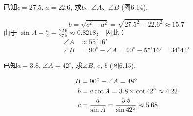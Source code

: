 \begin{example}
    已知$c=27.5$, $a=22.6$, 求$b$、$\angle A$、$\angle B$ (图6.14).
\end{example}

\begin{solution}
\[b=\sqrt{c^2-a^2}=\sqrt{27.5^2-22.6^2}\approx 15.7\]
由于
$\sin A=\frac{a}{c}=\frac{22.6}{27.5}\approx 0.8218$，
因此：
\[\begin{split}
    \angle A&\approx 55^{\circ}16'\\
\angle B&=90^{\circ}-\angle A=90^{\circ}-55^{\circ}16'=34^{\circ}44'
\end{split}\]
\end{solution}


\begin{example}
    已知$a=3.8$, $\angle A=42^{\circ}$, 求$\angle B$, $c$, $b$ (图6.15).
\end{example}

\begin{solution}
\[\begin{split}
    B&=90^{\circ} -\angle A=48^{\circ} \\
b&=a \cot A=3.8\times\cot 42^{\circ}\approx 4.22\\
c&=\dfrac{a}{\sin A}=\dfrac{3.8}{\sin 42^{\circ}}\approx 5.68 
\end{split}\]
    
\end{solution}

\begin{figure}[htp]\centering
    \begin{minipage}[t]{0.48\textwidth}
    \centering
{}
    \caption{}
    \end{minipage}
    \begin{minipage}[t]{0.48\textwidth}
    \centering
    \caption{}
    \end{minipage}
    \end{figure}


